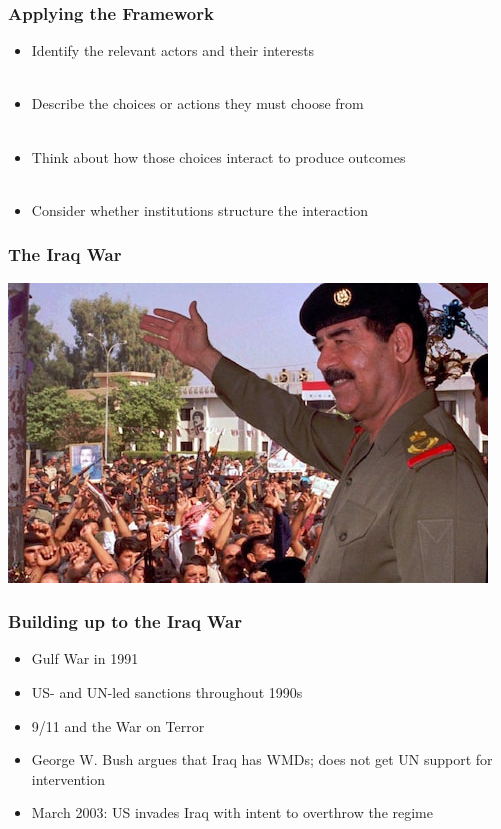 \documentclass[handout]{beamer}
\begin{document}
\begin{frame} 
	\frametitle{\LARGE{Applying the Framework}}
	\begin{itemize}
		\item Identify the relevant actors and their interests \pause
		\\~\\ 
		\item Describe the choices or actions they must choose from \pause 
		\\~\\ 
		\item Think about how those choices interact to produce outcomes \pause 
		\\~\\ 
		\item Consider whether institutions structure the interaction
	\end{itemize}
\end{frame}

\begin{frame} 
	\frametitle{\LARGE{The Iraq War}}
	\centering
	\includegraphics[width=\textwidth,height=0.8\textheight,keepaspectratio]{Hussein.jpg}
\end{frame}

\begin{frame} 
	\frametitle{\LARGE{Building up to the Iraq War}}
	\begin{itemize}
		\item Gulf War in 1991
		\item US- and UN-led sanctions throughout 1990s
		\item 9/11 and the War on Terror
		\item George W. Bush argues that Iraq has WMDs; does not get UN support for intervention
		\item March 2003: US invades Iraq with intent to overthrow the regime
	\end{itemize}
\end{frame}
\end{document}
